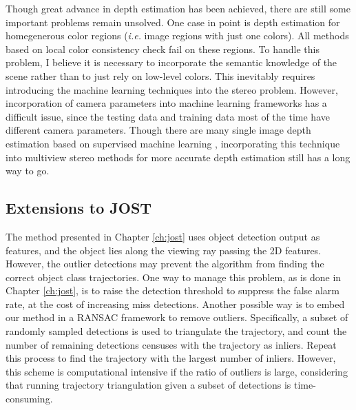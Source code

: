 Though great advance in depth estimation has been achieved, there are still some important problems remain unsolved. One case in point is depth estimation for homegenerous color regions (\emph{i.e.} image regions with just one colors). All methods based on local color consistency check fail on these regions. To handle this problem, I believe it is necessary to incorporate the semantic knowledge of the scene rather than to just rely on low-level colors. This inevitably requires introducing the machine learning techniques into the stereo problem. However, incorporation of camera parameters into machine learning frameworks has a difficult issue, since the testing data and training data most of the time have different camera parameters. Though there are many single image depth estimation based on supervised machine learning  \cite{Hoiem_CGRAPH2005,Saxena_IJCV2008,eigen2014depth,Liu2014,zhuo2015indoor}, incorporating this technique into multiview stereo methods for more accurate depth estimation still has a long way to go.

\subsection{Extensions to JOST}

The method presented in Chapter \ref{ch:jost} uses object detection output as features, and the object lies along the viewing ray passing the 2D features. However, the outlier detections may prevent the algorithm from finding the correct object class trajectories. One way to manage this problem, as is done in Chapter \ref{ch:jost}, is to raise the detection threshold to suppress the false alarm rate, at the cost of increasing miss detections. Another possible way is to embed our method in a RANSAC framework \cite{Hartley2004} to remove outliers. Specifically, a subset of randomly sampled detections is used to triangulate the trajectory, and count the number of remaining detections censuses with the trajectory as inliers. Repeat this process to find the trajectory with the largest number of inliers. However, this scheme is computational intensive if the ratio of outliers is large, considering that running trajectory triangulation given a subset of detections is time-consuming. 

